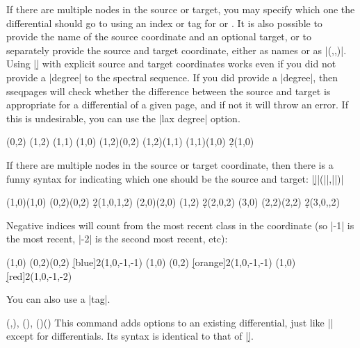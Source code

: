 \documentclass{ltxdoc}
\begin{document}
\begin{sseqdata}[name=ex1,degree={#1}{1-#1}]
\begin{commandlist}
If there are multiple nodes in the source or target, you may specify which one the differential should go to using an index or tag for  or . It is also possible to provide the name of the source coordinate and an optional target, or to separately provide the source and target coordinate, either as names or as |(,,)|. Using |\d| with explicit source and target coordinates works even if you did not provide a |degree| to the spectral sequence. If you did provide a |degree|, then sseqpages will check whether the difference between the source and target is appropriate for a differential of a given page, and if not it will throw an error. If this is undesirable, you can use the |lax degree| option.
\begin{codeexample}[width=7.5cm]
\begin{sseqdata}[name=d example,degree={-1}{#1},
                 struct lines=blue]
\class(0,2)
\class(1,2)
\class(1,1)
\class(1,0)
\structline(1,2)(0,2)
\structline(1,2)(1,1)
\structline(1,1)(1,0)
\d2(1,0)
\end{sseqdata}
\printpage[name=d example,page=2]
\hskip0.3cm
\printpage[name=d example,page=3]
\end{codeexample}
If there are multiple nodes in the source or target coordinate, then there is a funny syntax for indicating which one should be the source and target:
|\d||(||,||)|
\begin{codeexample}[width=6cm]
\begin{sseqpage}
\class(1,0)\class(1,0)
\class(0,2)\class(0,2)
\d2(1,0,1,2)
\class(2,0)\class(2,0)
\class(1,2)
\d2(2,0,2)
\class(3,0)
\class(2,2)\class(2,2)
\d2(3,0,,2)
\end{sseqpage}
\end{codeexample}
Negative indices will count from the most recent class in the coordinate (so |-1| is the most recent, |-2| is the second most recent, etc):
\begin{codeexample}[]
\begin{sseqpage}
\class(1,0)
\class(0,2)\class(0,2)
\d[blue]2(1,0,-1,-1)
\class(1,0)
\class(0,2)
\d[orange]2(1,0,-1,-1)
\class(1,0)
\d[red]2(1,0,-1,-2)
\end{sseqpage}
\end{codeexample}
You can also use a |tag|.
\end{commandlist}

\begin{commandlist}{
    {(,)},
    {()},
    {()()}%
}
This command adds options to an existing differential, just like |\classoptions| except for differentials. Its syntax is identical to that of |\d|.
\end{commandlist}


\end{sseqdata}
\end{document}

